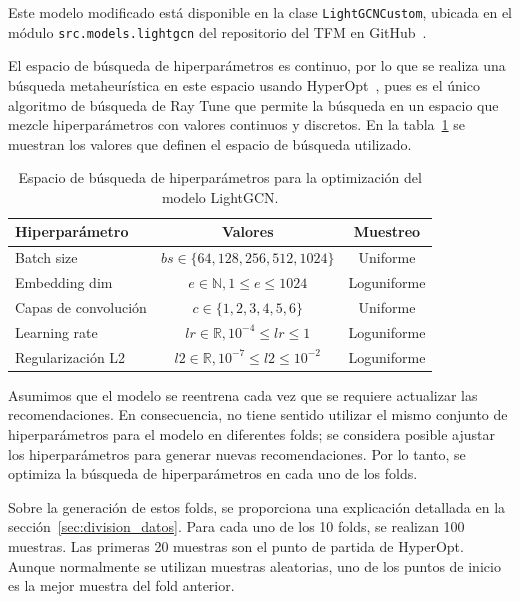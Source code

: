 Este modelo modificado está disponible en la clase \texttt{LightGCNCustom}, ubicada en el módulo \texttt{src.models.lightgcn} del repositorio del TFM en GitHub~\cite{davo_daviddavoupm-tfm-notebooks_2024}. 

El espacio de búsqueda de hiperparámetros es continuo, por lo que se realiza una búsqueda metaheurística en este espacio usando HyperOpt~\cite{bergstra_making_2013}, pues es el único algoritmo de búsqueda de Ray Tune que permite la búsqueda en un espacio que mezcle hiperparámetros con valores continuos y discretos. En la tabla~\ref{tab:lightgcn_espacio_busqueda} se muestran los valores que definen el espacio de búsqueda utilizado.

\begin{table}[tbh]
    \centering
    \begin{tabular}{l|cc}
        \toprule
        \textbf{Hiperparámetro} & \textbf{Valores} & \textbf{Muestreo} \\
        \midrule
        Batch size & $bs\in\{ 64, 128, 256, 512, 1024 \} $ & Uniforme \\
        Embedding dim & $e\in\mathbb{N}, 1 \leq e \leq 1024$ & Loguniforme \\
        Capas de convolución & $c\in \{1,2,3,4,5,6\} $ & Uniforme \\
        Learning rate & $lr\in\mathbb{R}, 10^{-4} \leq lr \leq 1$ & Loguniforme \\
        Regularización L2 & $l2\in\mathbb{R}, 10^{-7}\leq l2 \leq 10^{-2}$ & Loguniforme \\ 
        \bottomrule
    \end{tabular}
    \caption{Espacio de búsqueda de hiperparámetros para la optimización del modelo LightGCN.}
    \label{tab:lightgcn_espacio_busqueda}
\end{table}

Asumimos que el modelo se reentrena cada vez que se requiere actualizar las recomendaciones. En consecuencia, no tiene sentido utilizar el mismo conjunto de hiperparámetros para el modelo en diferentes folds; se considera posible ajustar los hiperparámetros para generar nuevas recomendaciones. Por lo tanto, se optimiza la búsqueda de hiperparámetros en cada uno de los folds.

Sobre la generación de estos folds, se proporciona una explicación detallada en la sección~\ref{sec:division_datos}. Para cada uno de los 10 folds, se realizan 100 muestras. Las primeras 20 muestras son el punto de partida de HyperOpt. Aunque normalmente se utilizan muestras aleatorias, uno de los puntos de inicio es la mejor muestra del fold anterior.

